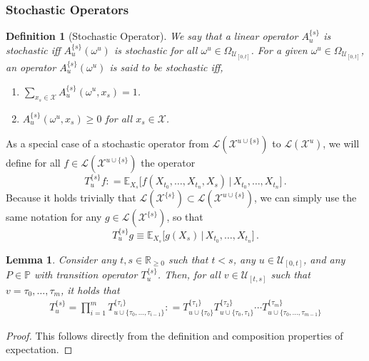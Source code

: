 \documentclass[10pt]{paper}
\newtheorem{lemma}[theorem]{Lemma}
\newtheorem{definition}{Definition}
\newcommand{\reals}{\mathbb{R}}
\newcommand{\realsnonneg}{\reals_{\geq 0}}
\newcommand{\states}{\mathcal{X}}
\newcommand{\gambles}{\mathcal{L}}
\newcommand{\coloneqq}{:\!=}
\begin{document}
\subsubsection{Stochastic Operators}

\begin{definition}[Stochastic Operator]\label{def:stoch_op}
We say that a linear operator $A_u^{\{s\}}$ is \emph{stochastic} iff $A_u^{\{s\}}(\omega^u)$ is stochastic for all $\omega^u\in\Omega_{\mathcal{U}_{[0,t]}}$. For a given $\omega^u\in\Omega_{\mathcal{U}_{[0,t]}}$, an operator $A_u^{\{s\}}(\omega^u)$ is said to be stochastic iff, 
\begin{enumerate}[label=SO\arabic*:]
\item $\sum_{x_s\in\states}A_u^{\{s\}}(\omega^u,x_s) = 1$.
\item $A_u^{\{s\}}(\omega^u, x_s) \geq 0 $ for all $x_s\in\states$.
\end{enumerate}
\end{definition}


As a special case of a stochastic operator from $\gambles(\states^{u\cup\{s\}})$ to $\gambles(\states^u)$, we will define for all $f\in\gambles(\states^{u\cup\{s\}})$ the operator
\begin{equation*}
T_u^{\{s\}}f \coloneqq \mathbb{E}_{X_{s}}\bigl[f(X_{t_0},\ldots,X_{t_n},X_s)\,\vert\,X_{t_0},\ldots,X_{t_n}\bigr]\,.
\end{equation*}
Because it holds trivially that $\gambles(\states^{\{s\}})\subset \gambles(\states^{u\cup\{s\}})$, we can simply use the same notation for any $g\in\gambles(\states^{\{s\}})$, so that
\begin{equation*}
T_u^{\{s\}}g \equiv \mathbb{E}_{X_s}\bigl[g(X_s)\,\vert\,X_{t_0},\ldots,X_{t_n}\bigr]\,.
\end{equation*}
\begin{lemma}\label{lemma:nonmarkov_transition_decompose}
Consider any $t,s\in\realsnonneg$ such that $t<s$, any $u\in\mathcal{U}_{[0,t]}$, and any $P\in\mathbb{P}$ with transition operator $T_u^{\{s\}}$. Then, for all $v\in\mathcal{U}_{[t,s]}$ such that $v= \tau_0,\ldots,\tau_m$, it holds that
\begin{align*}
T_u^{\{s\}} = \prod_{i=1}^{m} T_{u\cup\{\tau_0,\ldots,\tau_{i-1}\}}^{\{\tau_i\}} \coloneqq T_{u\cup\{\tau_0\}}^{\{\tau_1\}}T_{u\cup\{\tau_0,\tau_1\}}^{\{\tau_2\}}\cdots T_{u\cup\{\tau_0,\ldots,\tau_{m-1}\}}^{\{\tau_m\}}
\end{align*}
\end{lemma}
\begin{proof}
This follows directly from the definition and composition properties of expectation.
\end{proof}
\end{document}

